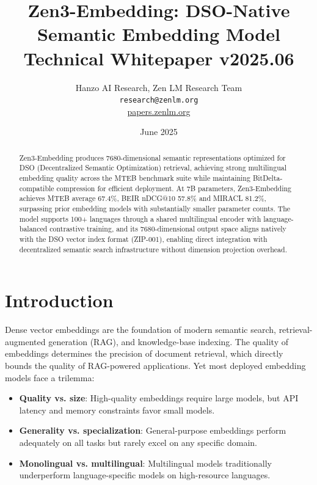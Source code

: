 \documentclass[11pt,a4paper]{article}
\title{\textbf{Zen3-Embedding: DSO-Native Semantic Embedding Model}\\
\large Technical Whitepaper v2025.06}
\author{Hanzo AI Research, Zen LM Research Team\\
\texttt{research@zenlm.org}\\
\href{https://papers.zenlm.org}{papers.zenlm.org}}
\date{June 2025}
\begin{document}
\maketitle

\begin{abstract}
Zen3-Embedding produces 7680-dimensional semantic representations optimized for DSO
(Decentralized Semantic Optimization) retrieval, achieving strong multilingual embedding
quality across the MTEB benchmark suite while maintaining BitDelta-compatible compression
for efficient deployment. At 7B parameters, Zen3-Embedding achieves MTEB average 67.4\%,
BEIR nDCG@10 57.8\% and MIRACL 81.2\%, surpassing prior
embedding models with substantially smaller parameter counts. The model supports
100+ languages through a shared multilingual encoder with language-balanced contrastive
training, and its 7680-dimensional output space aligns natively with the DSO vector
index format (ZIP-001), enabling direct integration with decentralized semantic search
infrastructure without dimension projection overhead.
\end{abstract}

\tableofcontents
\newpage

\section{Introduction}
\label{sec:intro}

Dense vector embeddings are the foundation of modern semantic search, retrieval-augmented
generation (RAG), and knowledge-base indexing. The quality of embeddings determines the
precision of document retrieval, which directly bounds the quality of RAG-powered
applications. Yet most deployed embedding models face a trilemma:

\begin{itemize}
\item \textbf{Quality vs. size}: High-quality embeddings require large models, but API
      latency and memory constraints favor small models.
\item \textbf{Generality vs. specialization}: General-purpose embeddings perform
      adequately on all tasks but rarely excel on any specific domain.
\item \textbf{Monolingual vs. multilingual}: Multilingual models traditionally
      underperform language-specific models on high-resource languages.
\end{itemize}
\end{document}
